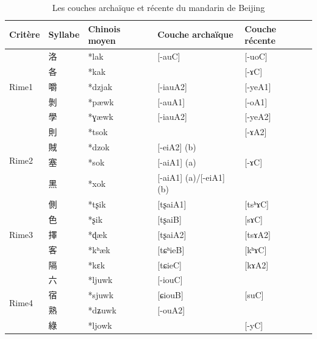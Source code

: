 \documentclass{scrbook}
\newcounter{c}[subsubsection]
\newcommand{\difwenbai}{couches archaïque et récente\xspace}
\begin{document}
\begin{sloppypar}
\begin{table}[htbp]
  \centering
    \begin{tabular}{lllrl}
    \toprule
    Critère & Syllabe & Chinois moyen  & \multicolumn{1}{l}{Couche archaïque} & Couche récente \\
    \midrule
    \multirow{5}[2]{*}{Rime1} & 洛     & *lak  & \multicolumn{1}{l}{[-auC]} & [-uoC] \\
          & 各     & *kak  &       & [-ɤC] \\
          & 嚼     & *dzjak & \multicolumn{1}{l}{\cellcolor[rgb]{ .851,  .851,  .851}[-iauA2]} & [-yeA1] \\
          & 剝     & *pæwk & \multicolumn{1}{l}{[-auA1]} & [-oA1] \\
          & 學     & *ɣæwk & \multicolumn{1}{l}{\cellcolor[rgb]{ .851,  .851,  .851}[-iauA2]} & [-yeA2] \\
    \midrule
    \multirow{4}[2]{*}{Rime2} & 則     & *tsok &       & [-ɤA2] \\
          & 賊     & *dzok & \multicolumn{1}{l}{\cellcolor[rgb]{ .851,  .851,  .851}[-eiA2] (b)} &  \\
          & 塞     & *sok  & \multicolumn{1}{l}{[-aiA1] (a)} & [-ɤC] \\
          & 黑     & *xok  & \multicolumn{1}{l}{[-aiA1] (a)/[-eiA1] (b)} &  \\
    \midrule
    \multirow{5}[2]{*}{Rime3} & 側     & *tʂik & \multicolumn{1}{l}{[tʂaiA1]} & [tsʰɤC] \\
          & 色     & *ʂik  & \multicolumn{1}{l}{\cellcolor[rgb]{ .851,  .851,  .851}[tʂaiB]} & [sɤC] \\
          & 擇     & *ɖæk  & \multicolumn{1}{l}{\cellcolor[rgb]{ .851,  .851,  .851}[tʂaiA2]} & [tsɤA2] \\
          & 客     & *kʰæk & \multicolumn{1}{l}{\cellcolor[rgb]{ .851,  .851,  .851}[tɕʰieB]} & [kʰɤC] \\
          & 隔     & *kɛk  & \multicolumn{1}{l}{[tɕieC]} & [kɤA2]   \\
    \midrule
    \multirow{4}[2]{*}{Rime4} & 六     & *ljuwk & \multicolumn{1}{l}{[-iouC]} &  \\
          & 宿     & *sjuwk & \multicolumn{1}{l}{\cellcolor[rgb]{ .851,  .851,  .851}[ɕiouB]} & [suC] \\
          & 熟     & *dʑuwk & \multicolumn{1}{l}{\cellcolor[rgb]{ .851,  .851,  .851}[-ouA2]} &  \\
          & 綠     & *ljowk &       & [-yC] \\
    \bottomrule
    \end{tabular}%
  \caption{Les \difwenbai du mandarin de Beijing}
  \label{tab:Beijing1}%
\end{table}%


\end{sloppypar}
\end{document}
